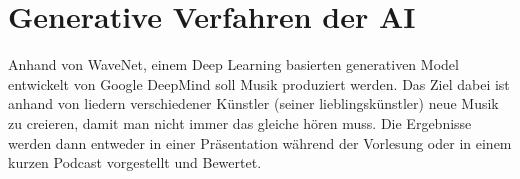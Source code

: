 \chapter{Generative Verfahren der \ac{AI}}

Anhand von WaveNet, einem Deep Learning basierten generativen Model entwickelt von Google DeepMind soll Musik produziert werden. Das Ziel dabei ist anhand von liedern verschiedener Künstler (seiner lieblingskünstler) neue Musik zu creieren, damit man nicht immer das gleiche hören muss. Die Ergebnisse werden dann entweder in einer Präsentation während der Vorlesung oder in einem kurzen Podcast vorgestellt und Bewertet.

